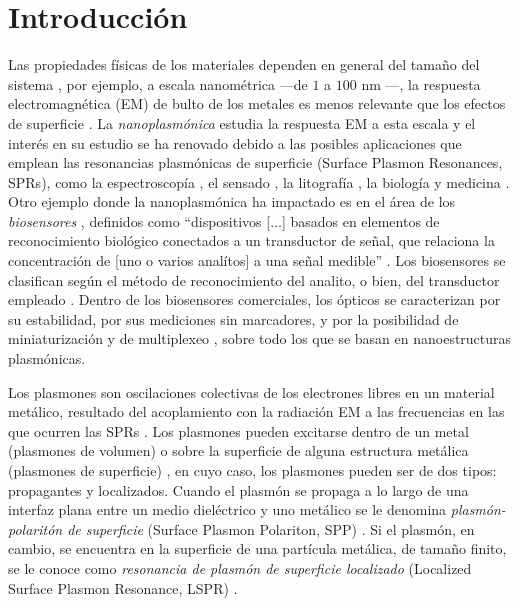 
\chapter*{Introducción}
\label{chapter:Motivacion}


Las propiedades físicas de los materiales dependen en general del tamaño del sistema \cite{boverhof2015comparative}, por ejemplo, a escala nanom\'etrica ---de $1$ a $100$ nm \cite{boverhof2015comparative}---, la respuesta electromagn\'etica (EM) de bulto de los metales es menos relevante que los efectos de superficie \cite{zhao2008methods}.  La \emph{nanoplasm\'onica} estudia la respuesta EM a esta escala y el inter\'es en su estudio se ha renovado debido a las posibles aplicaciones que emplean las resonancias plasm\'onicas de superficie (Surface Plasmon Resonances, SPRs), como la espectroscop\'ia \cite{novotny2006principles}, el sensado \cite{jain2008noble}, la litograf\'ia \cite{stockman2011nanoplasmonics}, la biolog\'ia y  medicina \cite{jain2008noble}. Otro ejemplo donde la nanoplasmónica ha impactado es en el área de los \textit{biosensores} \cite{estevez2014trends,mun2015nanobiosensors}, definidos como ``dispositivos [$\ldots$] basados en elementos de reconocimiento biológico conectados a un transductor de señal, que relaciona la concentración de [uno o varios analítos] a una señal medible'' \cite{mun2015nanobiosensors}. Los biosensores se clasifican según el método de reconocimiento del analito, o bien, del transductor empleado \cite{mun2015nanobiosensors}. Dentro de los biosensores comerciales, los ópticos se caracterizan por su estabilidad, por sus mediciones sin marcadores, y por la  posibilidad de miniaturización y de multiplexeo \cite{estevez2014trends}, sobre todo los que se basan en nanoestructuras plasmónicas.

Los plasmones son oscilaciones colectivas de los electrones libres en un material metálico,  resultado del  acoplamiento con la radiaci\'on EM a las frecuencias en las que ocurren las SPRs \cite{stockman2011nanoplasmonics}.  Los plasmones pueden excitarse dentro de un metal (plasmones de volumen) o  sobre la superficie de alguna estructura metálica (plasmones de superficie) \cite{maier2007plasmonics}, en cuyo caso, los plasmones pueden ser de dos tipos: propagantes y localizados.  Cuando el plasmón se propaga a lo largo de una interfaz plana entre un medio diel\'ectrico y uno met\'alico se le denomina  \emph{plasm\'on-polarit\'on de superficie} (Surface Plasmon Polariton, SPP) \cite{maier2007plasmonics}.  Si el plasmón, en cambio, se encuentra en la superficie de una partícula  met\'alica, de tamaño finito, se le conoce como \emph{resonancia de plasm\'on de superficie localizado} (Localized Surface Plasmon Resonance, LSPR) \cite{maier2007plasmonics}.

